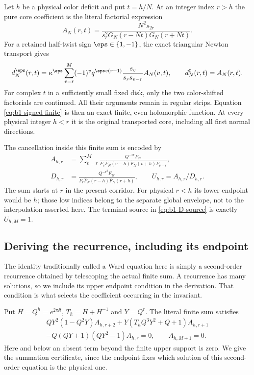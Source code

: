 Let $h$ be a physical color deficit and put $t=h/N$. At an integer
index $r>h$ the pure core coefficient is the literal factorial expression
\begin{equation}\label{eq:b1-pure-coefficient}
 A_N(r,t)=\frac{N^2s_{2r}}
 {s_r^2G_N(r-Nt)G_N(r+Nt)}.
\end{equation}
For a retained half-twist sign $\eps\in\{1,-1\}$, the exact triangular
Newton transport gives
\begin{equation}\label{eq:b1-signed-finite}
 d_N^\eps(r,t)=\kappa^\eps
 \sum_{v=r}^{M}(-1)^v q^{\eps v(r+1)}
 \frac{s_v}{s_rs_{v-r}} A_N(v,t),
 \qquad d_N^0(r,t)=A_N(r,t).
\end{equation}
For complex $t$ in a sufficiently small fixed disk, only the two
color-shifted factorials are continued. All their arguments remain in
regular strips. Equation \eqref{eq:b1-signed-finite} is then an exact
finite, even holomorphic function. At every physical integer $h<r$ it
is the original transported core, including all first normal directions.

The cancellation inside this finite sum is encoded by
\begin{align}
 A_{h,r}
 &=\sum_{v=r}^{M}
 \frac{Q^{-vr}F_{2v}}
 {F_v\widehat F_N(v-h)\widehat F_N(v+h)F_{v-r}},
 \label{eq:b1-A-source}\\
 D_{h,r}
 &=\frac{Q^{-r^2}F_{2r}}
 {F_r\widehat F_N(r-h)\widehat F_N(r+h)},
 \qquad U_{h,r}=A_{h,r}/D_{h,r}.
 \label{eq:b1-D-source}
\end{align}
The sum starts at $r$ in the present corridor. For physical $r<h$ its
lower endpoint would be $h$; those low indices belong to the separate
global envelope, not to the interpolation asserted here. The terminal
source in \eqref{eq:b1-D-source} is exactly $U_{h,M}=1$.

\subsection{Deriving the recurrence, including its endpoint}

The identity traditionally called a Ward equation here is simply a second-order recurrence obtained by telescoping the actual finite sum. A recurrence has many solutions, so we include its upper endpoint condition in the derivation. That condition is what selects the coefficient occurring in the invariant.

Put $H=Q^h=e^{2\pi\ii t}$, $T_h=H+H^{-1}$ and $Y=Q^r$. The
literal finite sum satisfies
\begin{multline}\label{eq:b1-Ward}
 QY^2(1-Q^2Y)A_{h,r+2}
 +Y(T_hQ^3Y^2+Q+1)A_{h,r+1}\\
 -Q(QY+1)(QY^2-1)A_{h,r}=0,
 \qquad A_{h,M+1}=0.
\end{multline}
Here and below an absent term beyond the finite upper support is zero.
We give the summation certificate, since the endpoint fixes which
solution of this second-order equation is the physical one.

